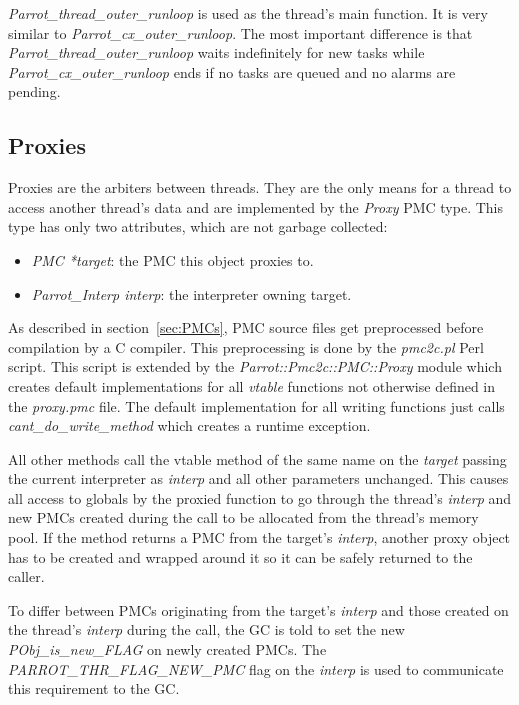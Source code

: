 \documentclass[bachelor,english]{hgbthesis}
\begin{document}
\textit{Parrot\_thread\_outer\_runloop} is used as the thread's main function. It is very similar to \textit{Parrot\_cx\_outer\_runloop}. The most important difference is that \textit{Parrot\_thread\_outer\_runloop} waits indefinitely for new tasks while \textit{Parrot\_cx\_outer\_runloop} ends if no tasks are queued and no alarms are pending.

\subsection{Proxies}

Proxies are the arbiters between threads. They are the only means for a thread to access another thread's data and are implemented by the \textit{Proxy} PMC type. This type has only two attributes, which are not garbage collected:
%
\begin{itemize}
\item \textit{PMC *target}: the PMC this object proxies to.
\item \textit{Parrot\_Interp interp}: the interpreter owning target.
\end{itemize}

As described in section~\ref{sec:PMCs}, PMC source files get preprocessed before compilation by a C compiler. This preprocessing is done by the \textit{pmc2c.pl} Perl script. This script is extended by the \textit{Parrot::Pmc2c::PMC::Proxy} module which creates default implementations for all \textit{vtable} functions not otherwise defined in the \textit{proxy.pmc} file. The default implementation for all writing functions just calls \textit{cant\_do\_write\_method} which creates a runtime exception.

All other methods call the vtable method of the same name on the \textit{target} passing the current interpreter as \textit{interp} and all other parameters unchanged. This causes all access to globals by the proxied function to go through the thread's \textit{interp} and new PMCs created during the call to be allocated from the thread's memory pool. If the method returns a PMC from the target's \textit{interp}, another proxy object has to be created and wrapped around it so it can be safely returned to the caller.

To differ between PMCs originating from the target's \textit{interp} and those created on the thread's \textit{interp} during the call, the GC is told to set the new \textit{PObj\_is\_new\_FLAG} on newly created PMCs. The \textit{PARROT\_\-THR\_\-FLAG\_\-NEW\_\-PMC} flag on the \textit{interp} is used to communicate this requirement to the GC.
\end{document}
